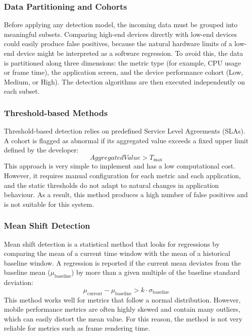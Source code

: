 \subsubsection{Data Partitioning and Cohorts}
Before applying any detection model, the incoming data must be grouped into meaningful subsets. Comparing high-end devices directly with low-end devices could easily produce false positives, because the natural hardware limits of a low-end device might be interpreted as a software regression. To avoid this, the data is partitioned along three dimensions: the metric type (for example, CPU usage or frame time), the application screen, and the device performance cohort (Low, Medium, or High). The detection algorithms are then executed independently on each subset.

\subsubsection{Threshold-based Methods}
Threshold-based detection relies on predefined Service Level Agreements (SLAs). A cohort is flagged as abnormal if its aggregated value exceeds a fixed upper limit defined by the developer:
\begin{equation}
    AggregatedValue > T_{\text{max}}
\end{equation}
This approach is very simple to implement and has a low computational cost. However, it requires manual configuration for each metric and each application, and the static thresholds do not adapt to natural changes in application behaviour. As a result, this method produces a high number of false positives and is not suitable for this system.

\subsubsection{Mean Shift Detection}
Mean shift detection is a statistical method that looks for regressions by comparing the mean of a current time window with the mean of a historical baseline window. A regression is reported if the current mean deviates from the baseline mean ($\mu_{\text{baseline}}$) by more than a given multiple of the baseline standard deviation:
\begin{equation}
    \mu_{\text{current}} - \mu_{\text{baseline}} > k \cdot \sigma_{\text{baseline}}
\end{equation}
This method works well for metrics that follow a normal distribution. However, mobile performance metrics are often highly skewed and contain many outliers, which can easily distort the mean value. For this reason, the method is not very reliable for metrics such as frame rendering time.

